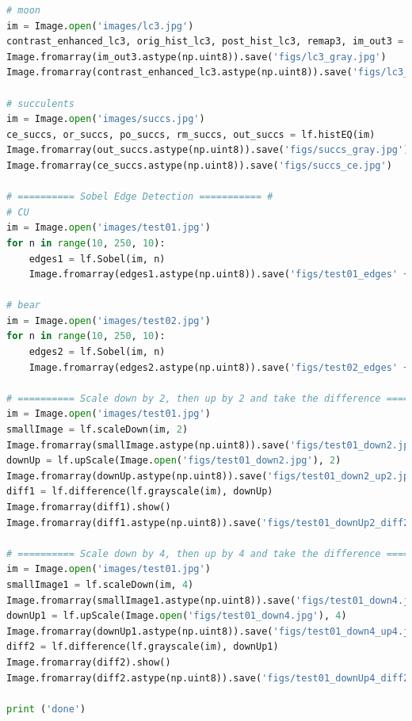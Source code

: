 \documentclass[11pt,a4paper]{article}
\begin{document}
\begin{lstlisting}[language=Python,label={lst:main}]
# moon
im = Image.open('images/lc3.jpg')
contrast_enhanced_lc3, orig_hist_lc3, post_hist_lc3, remap3, im_out3 = lf.histEQ(im)
Image.fromarray(im_out3.astype(np.uint8)).save('figs/lc3_gray.jpg')
Image.fromarray(contrast_enhanced_lc3.astype(np.uint8)).save('figs/lc3_ce.jpg')

# succulents
im = Image.open('images/succs.jpg')
ce_succs, or_succs, po_succs, rm_succs, out_succs = lf.histEQ(im)
Image.fromarray(out_succs.astype(np.uint8)).save('figs/succs_gray.jpg')
Image.fromarray(ce_succs.astype(np.uint8)).save('figs/succs_ce.jpg')

# ========== Sobel Edge Detection =========== #
# CU
im = Image.open('images/test01.jpg')
for n in range(10, 250, 10):
    edges1 = lf.Sobel(im, n)
    Image.fromarray(edges1.astype(np.uint8)).save('figs/test01_edges' + str(n) + '.jpg')

# bear
im = Image.open('images/test02.jpg')
for n in range(10, 250, 10):
    edges2 = lf.Sobel(im, n)
    Image.fromarray(edges2.astype(np.uint8)).save('figs/test02_edges' + str(n) + '.jpg')

# ========== Scale down by 2, then up by 2 and take the difference =========== #
im = Image.open('images/test01.jpg')
smallImage = lf.scaleDown(im, 2)
Image.fromarray(smallImage.astype(np.uint8)).save('figs/test01_down2.jpg')
downUp = lf.upScale(Image.open('figs/test01_down2.jpg'), 2)
Image.fromarray(downUp.astype(np.uint8)).save('figs/test01_down2_up2.jpg')
diff1 = lf.difference(lf.grayscale(im), downUp)
Image.fromarray(diff1).show()
Image.fromarray(diff1.astype(np.uint8)).save('figs/test01_downUp2_diff2.jpg')

# ========== Scale down by 4, then up by 4 and take the difference =========== #
im = Image.open('images/test01.jpg')
smallImage1 = lf.scaleDown(im, 4)
Image.fromarray(smallImage1.astype(np.uint8)).save('figs/test01_down4.jpg')
downUp1 = lf.upScale(Image.open('figs/test01_down4.jpg'), 4)
Image.fromarray(downUp1.astype(np.uint8)).save('figs/test01_down4_up4.jpg')
diff2 = lf.difference(lf.grayscale(im), downUp1)
Image.fromarray(diff2).show()
Image.fromarray(diff2.astype(np.uint8)).save('figs/test01_downUp4_diff2.jpg')

print ('done')
	\end{lstlisting}
\end{document}
